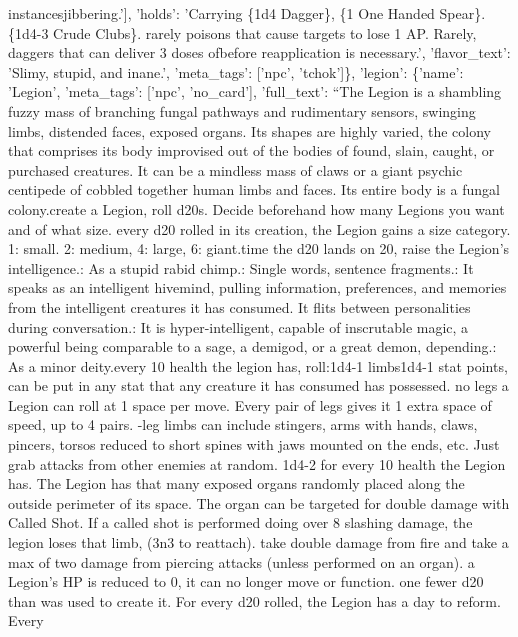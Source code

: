 \documentclass[
  letterpaper,
  DIV=11,
  numbers=noendperiod]{scrartcl}
\begin{document}
{instances\nof jibbering.'{]}, 'holds': 'Carrying \{1d4 Dagger\}, \{1 One
Handed Spear\}. \{1d4-3 Crude Clubs\}. \nMore rarely poisons that cause
targets to lose 1 AP. Rarely, daggers that can deliver 3 doses
of\npoison before reapplication is necessary.', 'flavor\_text': 'Slimy,
stupid, and inane.', 'meta\_tags': {[}'npc', 'tchok'{]}\}, 'legion':
\{'name': 'Legion', 'meta\_tags': {[}'npc', 'no\_card'{]}, 'full\_text':
``The Legion is a shambling fuzzy mass of branching fungal pathways and
rudimentary sensors, swinging limbs, distended faces, exposed organs.
Its shapes are highly varied, the colony that comprises its body
improvised out of the bodies of found, slain, caught, or purchased
creatures. It can be a mindless mass of claws or a giant psychic
centipede of cobbled together human limbs and faces. Its entire body is
a fungal colony.\n\nTo create a Legion, roll d20s. Decide beforehand how
many Legions you want and of what size. \n\nFor every d20 rolled in its
creation, the Legion gains a size category. 1: small. 2: medium, 4:
large, 6: giant.\n\nEvery time the d20 lands on 20, raise the Legion's
intelligence.\n{}: As a stupid rabid chimp.\n{}: Single words,
sentence fragments.\n{}: It speaks as an intelligent hivemind, pulling
information, preferences, and memories from the intelligent creatures it
has consumed. It flits between personalities during conversation.\n{}:
It is hyper-intelligent, capable of inscrutable magic, a powerful being
comparable to a sage, a demigod, or a great demon, depending.\n{}: As a
minor deity.\n\nFor every 10 health the legion has, roll:\n\n1d4-1
limbs\n\n1d4-1 stat points, can be put in any stat that any creature it
has consumed has possessed. \n\nWith no legs a Legion can roll at 1
space per move. Every pair of legs gives it 1 extra space of speed, up
to 4 pairs. \n\nNon-leg limbs can include stingers, arms with hands,
claws, pincers, torsos reduced to short spines with jaws mounted on the
ends, etc. Just grab attacks from other enemies at random.
\n\nRoll 1d4-2 for every 10 health the Legion has. The Legion has that
many exposed organs randomly placed along the outside perimeter of its
space. The organ can be targeted for double damage with Called Shot. If
a called shot is performed doing over 8 slashing damage, the legion
loses that limb, (3n3 to reattach). \n\nLegions take double damage from
fire and take a max of two damage from piercing attacks (unless
performed on an organ). \n\nWhen a Legion's HP is reduced to 0, it can
no longer move or function. \n\nRoll one fewer d20 than was used to
create it. For every d20 rolled, the Legion has a day to reform. Every
}
\end{document}
